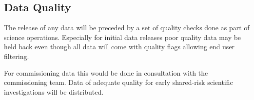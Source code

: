 \subsection{Data Quality} \label{sect:qa}

The release of any data will be preceded by a set of quality checks done as part of science operations. Especially for initial data releases poor quality data may be held back even though all data will come with quality flags allowing end user filtering.

For commissioning data this
would be done in consultation with the commissioning team.
Data of adequate quality for early shared-risk scientific investigations will be
distributed.

